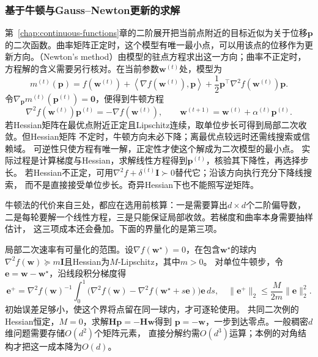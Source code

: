 \subsubsection{基于牛顿与Gauss–Newton更新的求解}
\label{sec:opt-newton-gauss-newton}

第~\ref{chap:continuous-functions}章的二阶展开把当前点附近的目标近似为关于位移$\bm p$的二次函数。曲率矩阵正定时，这个模型有唯一最小点，可以用该点的位移作为更新方向。（Newton's method）由模型的驻点方程求出这一方向；曲率不正定时，方程解的含义需要另行核对。在当前参数$\bm w^{(t)}$处，模型为
\[
  m^{(t)}(\bm{p})
  =
  f(\bm{w}^{(t)})
  +\left\langle\nabla f(\bm{w}^{(t)}),\bm{p}\right\rangle
  +\frac12\bm{p}^{\top}\nabla^2f(\bm{w}^{(t)})\bm{p}.
\]
令$\nabla_{\bm{p}}m^{(t)}(\bm{p}^{(t)})=\bm{0}$，便得到牛顿方程
\[
  \nabla^2 f(\bm{w}^{(t)})\bm{p}^{(t)}
  =-\nabla f(\bm{w}^{(t)}),\qquad
  \bm{w}^{(t+1)}=\bm{w}^{(t)}+\alpha^{(t)}\bm{p}^{(t)}.
\]
若Hessian矩阵在最优点附近正定且Lipschitz连续，取单位步长可得到局部二次收敛。但Hessian矩阵
不定时，牛顿方向未必下降；离最优点较远时还需线搜索或信赖域。
可逆性只使方程有唯一解，正定性才使这个解成为二次模型的最小点。
实际过程是计算梯度与Hessian，求解线性方程得到$\bm p^{(t)}$，核验其下降性，再选择步长。
若Hessian不正定，可用$\nabla^2f+\delta^{(t)}\bm I\succ0$替代它；沿该方向执行充分下降线搜索，
而不是直接接受单位步长。奇异Hessian下也不能照写逆矩阵。

牛顿法的代价来自三处，都应在选用前核算：一是需要算出$d\times d$个二阶偏导数，
二是每轮要解一个线性方程，三是只能保证局部收敛。若梯度和曲率本身需要抽样估计，
这三项成本还会叠加。下面的界量化的是第三项。

局部二次速率有可量化的范围。设$\nabla f(\bm w^\star)=0$，在包含$\bm w^\star$的球内
$\nabla^2f(\bm w)\succeq m\bm I$且Hessian为$M$-Lipschitz，其中$m>0$。
对单位牛顿步，令$\bm e=\bm w-\bm w^\star$，沿线段积分梯度得
\[
 \bm e^+
 =\nabla^2f(\bm w)^{-1}\!
 \int_0^1\bigl(\nabla^2f(\bm w)-\nabla^2f(\bm w^\star+s\bm e)\bigr)\bm e\,ds,
 \quad
 \|\bm e^+\|_2\leq\frac{M}{2m}\|\bm e\|_2^2.
\]
初始误差足够小，使这个界将点留在同一球内，才可逐轮使用。
共同二次例的Hessian恒定，$M=0$，求解$\bm H\bm p=-\bm H\bm w$得到
$\bm p=-\bm w$，一步到达零点。一般稠密$d$维问题需要存储$O(d^2)$个矩阵元素，
直接分解约需$O(d^3)$运算；本例的对角结构才把这一成本降为$O(d)$。

